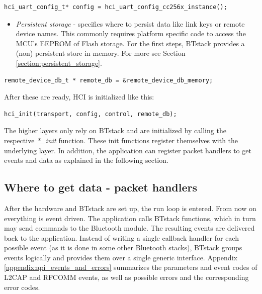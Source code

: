 \documentclass[a4paper,titlepage,oneside,12pt]{amsart} %
\begin{document}
\begin{lstlisting}
hci_uart_config_t* config = hci_uart_config_cc256x_instance();
\end{lstlisting}

\begin{itemize}
\item \emph {Persistent storage} - specifies where to persist data like link keys or remote device names. This commonly requires platform specific code to access the MCU's EEPROM of Flash storage. For the first steps, BTstack provides a (non) persistent store in memory. For more see Section \ref{section:persistent_storage}.
\end{itemize}

\begin{lstlisting}
remote_device_db_t * remote_db = &remote_device_db_memory;
\end{lstlisting}


After these are ready, HCI is initialized like this:
\begin{lstlisting}
hci_init(transport, config, control, remote_db);
\end{lstlisting}

The higher layers only rely on BTstack and are initialized by calling the respective \emph{*\_init} function. These init functions register themselves with the underlying layer. In addition, the application can register packet handlers to get events and data as explained in the following section.
   
\subsection{Where to get data - packet handlers}
\label{section:packetHandlers}

After the hardware and BTstack are set up, the run loop is entered. From now on everything is event driven. The application calls BTstack functions, which in turn may send commands to the Bluetooth module. The resulting events are delivered back to the application. Instead of writing a single callback handler for each possible event (as it is done in some other Bluetooth stacks), BTstack groups events logically and provides them over a single generic interface.  Appendix \ref{appendix:api_events_and_errors} summarizes the parameters and event codes of L2CAP and RFCOMM events, as well as possible errors and the corresponding error codes.
\end{document}
